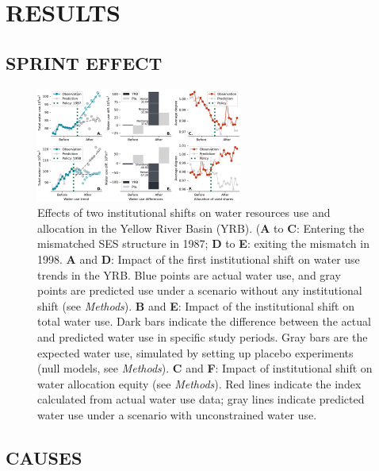 \documentclass{../nsr}
\begin{document}
\section{RESULTS}\label{results}
\subsection{SPRINT EFFECT}\label{phenomenon}


\begin{figure}
    \centering
    \includegraphics[width=16pc]{outputs/main_results.jpg}
    \caption{
        Effects of two institutional shifts on water resources use and allocation in the Yellow River Basin (YRB). (\textbf{A} to \textbf{C}: Entering the mismatched SES structure in 1987; \textbf{D} to \textbf{E}: exiting the mismatch in 1998. \textbf{A} and \textbf{D}: Impact of the first institutional shift on water use trends in the YRB. Blue points are actual water use, and gray points are predicted use under a scenario without any institutional shift (see \textit{Methods}). \textbf{B} and \textbf{E}: Impact of the institutional shift on total water use. Dark bars indicate the difference between the actual and predicted water use in specific study periods. Gray bars are the expected water use, simulated by setting up placebo experiments (null models, see \textit{Methods}). \textbf{C} and \textbf{F}: Impact of institutional shift on water allocation equity (see \textit{Methods}). Red lines indicate the index calculated from actual water use data; gray lines indicate predicted water use under a scenario with unconstrained water use.
    }
    \label{fig:main_results}
\end{figure}


\subsection{CAUSES}\label{causes}


\end{document}

